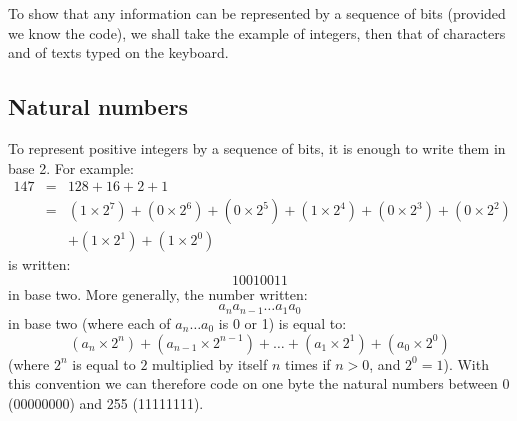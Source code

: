 To show that any information can be represented by a sequence of bits (provided
we know the code), we shall take the example of integers, then that of characters and
of texts typed on the keyboard.

\subsection{Natural numbers}

To represent positive integers by a sequence of bits, it is enough to write them in base
2. For example:
\[\begin{array}{lll}
147 & = &128 +  16 + 2 + 1 \\
       & = & (1 \times 2^{7}) + (0 \times 2^{6}) + (0 \times 2^{5}) + (1 \times 2^{4}) + (0 \times 2^{3}) + (0 \times 2^{2}) \\
       &    & + (1 \times 2^{1}) + (1 \times 2^{0})
\end{array}\]
is written: \[10010011\] in base two. More generally, the
 number written: \[a_{n}a_{n-1} \ldots a_{1}a_{0}\]
 in base two (where each of $a_{n} \ldots a_{0}$ is 0 or 1)
 is equal to:
\[(a_{n} \times 2^{n}) + (a_{n-1} \times 2^{n-1}) + \ldots
+ (a_{1} \times 2^{1}) + (a_{0} \times 2^{0})\]
(where $2^{n}$ is equal to $2$ multiplied by itself $n$ times if $n>0$, and $2^{0} = 1$).
With this convention we can therefore code
 on one byte the natural numbers between 0 (00000000) and 255 (11111111).

